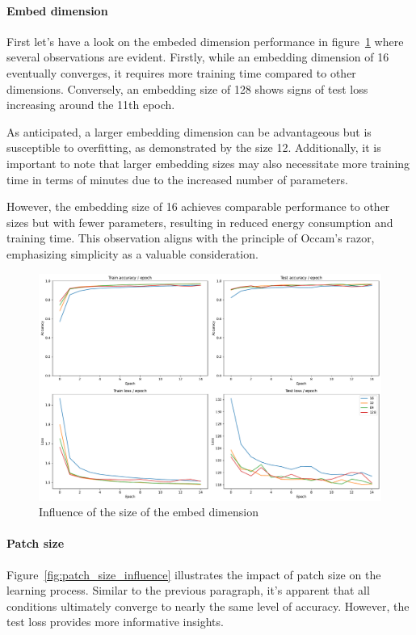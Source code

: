 \paragraph{Embed dimension}
First let's have a look on the embeded dimension performance in figure~\ref*{fig:embed_dim_influence} where several observations are evident. Firstly, while an embedding dimension of 16 eventually converges, it requires more training time compared to other dimensions. Conversely, an embedding size of 128 shows signs of test loss increasing around the 11th epoch.

As anticipated, a larger embedding dimension can be advantageous but is susceptible to overfitting, as demonstrated by the size 12. Additionally, it is important to note that larger embedding sizes may also necessitate more training time in terms of minutes due to the increased number of parameters.

However, the embedding size of 16 achieves comparable performance to other sizes but with fewer parameters, resulting in reduced energy consumption and training time. This observation aligns with the principle of Occam's razor, emphasizing simplicity as a valuable consideration.

\begin{figure}[H]
    \centering
    \includegraphics*[width=\textwidth]{figs/Transformers/embed_dim_influence.pdf}
    \caption{Influence of the size of the embed dimension}
    \label{fig:embed_dim_influence}
\end{figure}

\paragraph{Patch size}
Figure~\ref*{fig:patch_size_influence} illustrates the impact of patch size on the learning process. Similar to the previous paragraph, it's apparent that all conditions ultimately converge to nearly the same level of accuracy. However, the test loss provides more informative insights.

